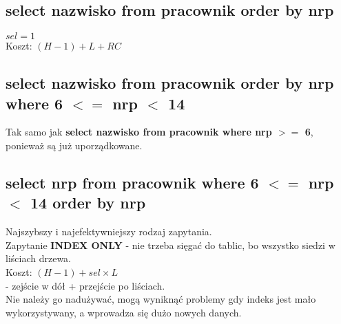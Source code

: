 \documentclass[a4paper,twoside]{article}
\begin{document}
  	\subsection*{select nazwisko from pracownik order by nrp} \noindent 
  	\(sel = 1\)\\
  	Koszt: \((H-1)+L+RC\)
  	
  	\subsection*{select nazwisko from pracownik order by nrp where 6 $ <= $ nrp $ < $ 14} \noindent 
  	Tak samo jak \textbf{select nazwisko from pracownik where nrp $ >= $ 6}, ponieważ są już uporządkowane.
  	
  	\subsection*{select nrp from pracownik where  6 $ <= $ nrp $ < $ 14 order by nrp}
  	Najszybszy i najefektywniejszy rodzaj zapytania.\\
  	Zapytanie \textbf{INDEX ONLY} - nie trzeba sięgać do tablic, bo wszystko siedzi w liściach drzewa.\\
  	Koszt: \((H-1)+sel\times L\)\\ - zejście w dół + przejście po liściach.\\
  	Nie należy go nadużywać, mogą wyniknąć problemy gdy indeks jest mało wykorzystywany, a wprowadza się dużo nowych danych.
  	
\end{document}
